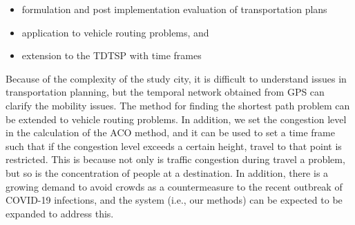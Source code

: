 \documentclass[conference]{IEEEtran}
\begin{document}
\begin{itemize}
 \item formulation and post implementation evaluation of transportation plans
 \item application to vehicle routing problems, and
 \item extension to the TDTSP with time frames
\end{itemize}

Because of the complexity of the study city, it is difficult to understand issues in transportation planning, but the temporal network obtained from GPS can clarify the mobility issues.
The method for finding the shortest path problem can be extended to vehicle routing problems.
In addition, we set the congestion level in the calculation of the ACO method, and it can be used to set a time frame such that if the congestion level exceeds a certain height, travel to that point is restricted.
This is because not only is traffic congestion during travel a problem, but so is the concentration of people at a destination.
In addition, there is a growing demand to avoid crowds as a countermeasure to the recent outbreak of COVID-19 infections, and the system (i.e., our methods) can be expected to be expanded to address this.



\end{document}
